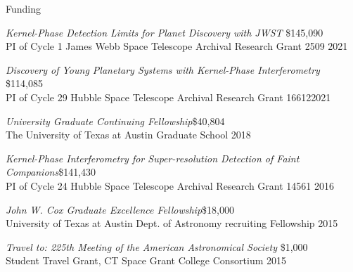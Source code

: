 \documentclass{resume} %
\begin{document}
\begin{rSection}{Funding} \itemsep -5pt  

    {\em Kernel-Phase Detection Limits for Planet Discovery with JWST} \hfill {\$145,090}\\ PI of Cycle 1 James Webb Space Telescope Archival Research Grant 2509 \hfill 2021 
    
    {\em Discovery of Young Planetary Systems with Kernel-Phase Interferometry} \hfill {\$114,085}\\ PI of Cycle 29 Hubble Space Telescope Archival Research Grant 16612\hfill 2021

    {\em University Graduate Continuing Fellowship}\hfill {\$40,804}\\ The University of Texas at Austin Graduate School \hfill2018

    {\em Kernel-Phase Interferometry for Super-resolution Detection of Faint Companions}\hfill{\$141,430}\\ PI of Cycle 24 Hubble Space Telescope Archival Research Grant 14561 \hfill 2016
    
    {\em John W. Cox Graduate Excellence Fellowship}\hfill {\$18,000}\\ University of Texas at Austin Dept. of Astronomy recruiting Fellowship \hfill 2015

    {\em Travel to: 225th Meeting of the American Astronomical Society} \hfill {\$1,000}\\ Student Travel Grant, CT Space Grant College Consortium \hfill 2015
        
\vspace{-5pt}
\end{rSection} 

\end{document}

